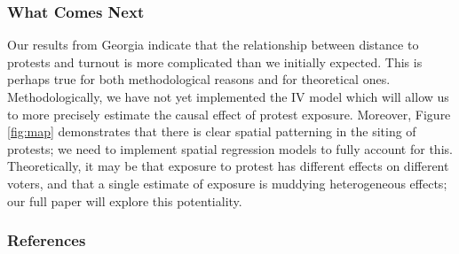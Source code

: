 \documentclass[
  12pt,
]{article}
\begin{document}
\hypertarget{what-comes-next}{%
\subsubsection*{What Comes Next}\label{what-comes-next}}

Our results from Georgia indicate that the relationship between distance to protests and turnout is more complicated than we initially expected. This is perhaps true for both methodological reasons and for theoretical ones. Methodologically, we have not yet implemented the IV model which will allow us to more precisely estimate the causal effect of protest exposure. Moreover, Figure \ref{fig:map} demonstrates that there is clear spatial patterning in the siting of protests; we need to implement spatial regression models to fully account for this. Theoretically, it may be that exposure to protest has different effects on different voters, and that a single estimate of exposure is muddying heterogeneous effects; our full paper will explore this potentiality.

\newpage

\hypertarget{references}{%
\subsubsection*{References}\label{references}}
\end{document}
